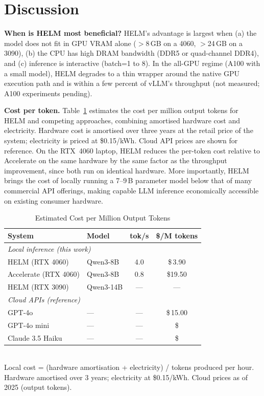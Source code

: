 \documentclass[lettersize,journal]{IEEEtran}
\begin{document}
\section{Discussion}
\label{sec:discussion}

\textbf{When is HELM most beneficial?}
HELM's advantage is largest when (a) the model does not fit in GPU VRAM
alone ($>$8\,GB on a 4060, $>$24\,GB on a 3090), (b) the CPU has high
DRAM bandwidth (DDR5 or quad-channel DDR4), and (c) inference is
interactive (batch=1 to 8). In the all-GPU regime (A100 with a small model),
HELM degrades to a thin wrapper around the native GPU execution path and is
within a few percent of vLLM's throughput (not measured; A100 experiments pending).

\textbf{Cost per token.}
Table~\ref{tab:cost_per_token} estimates the cost per million output tokens
for HELM and competing approaches, combining amortised hardware cost and
electricity. Hardware cost is amortised over three years at the retail price
of the system; electricity is priced at \$0.15/kWh. Cloud API prices are
shown for reference. On the RTX~4060 laptop, HELM reduces the per-token cost
relative to Accelerate on the same hardware by the same factor as the
throughput improvement, since both run on identical hardware. More
importantly, HELM brings the cost of locally running a 7--9\,B parameter
model below that of many commercial API offerings, making capable LLM
inference economically accessible on existing consumer hardware.

\begin{table}[!h]
\caption{Estimated Cost per Million Output Tokens}
\label{tab:cost_per_token}
\centering
\small
\begin{tabular}{llcc}
\toprule
\textbf{System} & \textbf{Model} & \textbf{tok/s} & \textbf{\$/M tokens} \\
\midrule
\multicolumn{4}{l}{\textit{Local inference (this work)}} \\
HELM (RTX 4060)      & Qwen3-8B   & 4.0             & \$\,3.90 \\
Accelerate (RTX 4060)& Qwen3-8B   & 0.8             & \$19.50 \\
HELM (RTX 3090)      & Qwen3-14B  & ---             & --- \\
\midrule
\multicolumn{4}{l}{\textit{Cloud APIs (reference)}} \\
GPT-4o               & —            & —               & \$\,15.00 \\
GPT-4o mini          & —            & —               & \$\;\;0.60 \\
Claude 3.5 Haiku     & —            & —               & \$\;\;0.80 \\
\bottomrule
\end{tabular}
\vspace{2pt}\\
\footnotesize{Local cost = (hardware amortisation + electricity) / tokens produced per hour.
Hardware amortised over 3 years; electricity at \$0.15/kWh.
Cloud prices as of 2025 (output tokens).}
\end{table}
\end{document}

